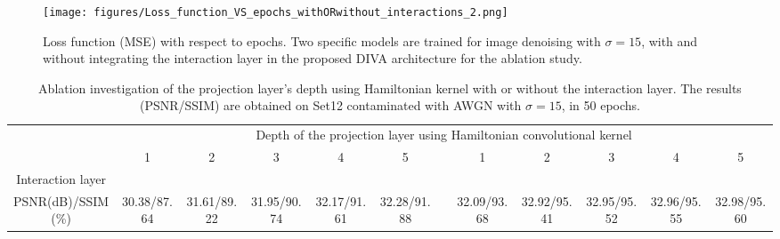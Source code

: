 \documentclass[10pt,journal,compsoc]{IEEEtran}
\newcommand{\cmark}{\ding{51}}%
\newcommand{\xmark}{\ding{55}}%
\begin{document}
\begin{figure}[t!]
\begin{centering}

\texttt{[image: figures/Loss\_function\_VS\_epochs\_withORwithout\_interactions\_2.png]}

\end{centering}
\caption{Loss function (MSE) with respect to epochs.
Two specific models are trained for image denoising with $\sigma = 15$, with and without integrating the interaction layer in the proposed DIVA architecture for the ablation study.}
\label{fig:ablation_loss_func}
\end{figure}






\begin{table*}[t!]
\setlength\tabcolsep{4pt}
\begin{scriptsize}
\begin{center}
\caption{Ablation investigation of the projection layer's depth using Hamiltonian kernel with or without the interaction layer. The results (PSNR/SSIM) are obtained on Set12 contaminated with AWGN with $\sigma = 15$, in 50 epochs.}
\label{tab:tab_ablation_depth_interaction}
\begin{tabular}{c ccccc c ccccc}

\hline
 & \multicolumn{11}{c}{Depth of the projection layer using Hamiltonian convolutional kernel}\\ 

& 1 & 2 & 3 & 4 & 5 && 1 & 2 & 3 & 4 & 5 \\
\hline

Interaction layer    & \xmark & \xmark & \xmark & \xmark & \xmark && \cmark & \cmark & \cmark  & \cmark & \cmark \\

\hline

PSNR(dB)/SSIM(\%)    & 30.38/87.64 & 31.61/89.22 & 31.95/90.74 & 32.17/91.61 & 32.28/91.88 && 32.09/93.68 & 32.92/95.41 & 32.95/95.52 & 32.96/95.55 & 32.98/95.60 \\

\hline

\end{tabular}\end{center}
\end{scriptsize}
\end{table*}
\end{document}
